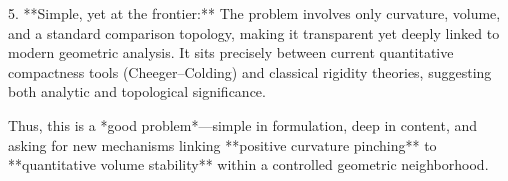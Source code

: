 5. **Simple, yet at the frontier:**  
   The problem involves only curvature, volume, and a standard comparison topology, making it transparent yet deeply linked to modern geometric analysis. It sits precisely between current quantitative compactness tools (Cheeger–Colding) and classical rigidity theories, suggesting both analytic and topological significance.

Thus, this is a *good problem*—simple in formulation, deep in content, and asking for new mechanisms linking **positive curvature pinching** to **quantitative volume stability** within a controlled geometric neighborhood.